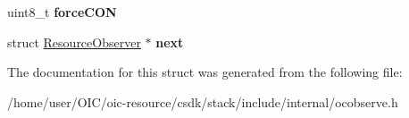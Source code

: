 \begin{DoxyCompactItemize}
\item 
\hypertarget{structResourceObserver_a227016c23f245d62ad22d509f39e4d2a}{}uint8\+\_\+t {\bfseries force\+C\+O\+N}\label{structResourceObserver_a227016c23f245d62ad22d509f39e4d2a}

\item 
\hypertarget{structResourceObserver_ab0184ea5180db5aed573cc9b58a9d20c}{}struct \hyperlink{structResourceObserver}{Resource\+Observer} $\ast$ {\bfseries next}\label{structResourceObserver_ab0184ea5180db5aed573cc9b58a9d20c}

\end{DoxyCompactItemize}


The documentation for this struct was generated from the following file\+:\begin{DoxyCompactItemize}
\item 
/home/user/\+O\+I\+C/oic-\/resource/csdk/stack/include/internal/ocobserve.\+h\end{DoxyCompactItemize}
